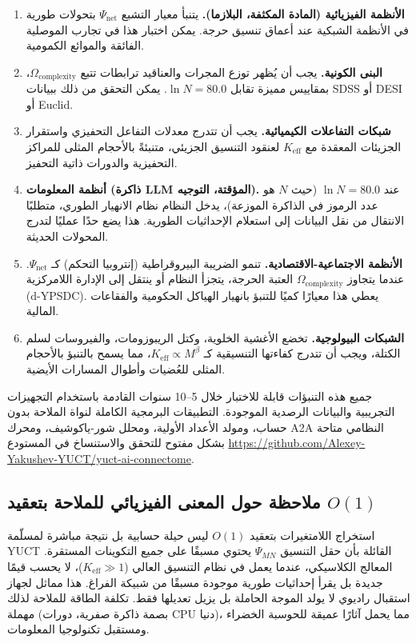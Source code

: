 \documentclass[11pt,a4paper]{article}
\newcommand{\Keff}{K_{\mathrm{eff}}}
\begin{document}
	\begin{enumerate}[label=(\arabic*)]
		\item \textbf{الأنظمة الفيزيائية (المادة المكثفة، البلازما).} يتنبأ معيار التشبع \(\Psi_{\mathrm{net}}\) بتحولات طورية في الأنظمة الشبكية عند أعماق تنسيق حرجة. يمكن اختبار هذا في تجارب الموصلية الفائقة والموائع الكمومية.
		\item \textbf{البنى الكونية.} يجب أن يُظهر توزع المجرات والعناقيد ترابطات تتبع \(\Omega_{\mathrm{complexity}}\)، بمقاييس مميزة تقابل \(\ln N = 80.0\). يمكن التحقق من ذلك ببيانات SDSS أو DESI أو Euclid.
		\item \textbf{شبكات التفاعلات الكيميائية.} يجب أن تتدرج معدلات التفاعل التحفيزي واستقرار الجزيئات المعقدة مع \(\Keff\) لعنقود التنسيق الجزيئي، متنبئةً بالأحجام المثلى للمراكز التحفيزية والدورات ذاتية التحفيز.
		\item \textbf{أنظمة المعلومات (ذاكرة LLM المؤقتة، التوجيه).} عند \(\ln N = 80.0\) (حيث \(N\) هو عدد الرموز في الذاكرة الموزعة)، يدخل النظام نظام الانهيار الطوري، متطلبًا الانتقال من نقل البيانات إلى استعلام الإحداثيات الطورية. هذا يضع حدًا عمليًا لتدرج المحولات الحديثة.
		\item \textbf{الأنظمة الاجتماعية-الاقتصادية.} تنمو الضريبة البيروقراطية (إنتروبيا التحكم) كـ \(\Psi_{\mathrm{net}}\). عندما يتجاوز \(\Omega_{\mathrm{complexity}}\) العتبة الحرجة، يتجزأ النظام أو ينتقل إلى الإدارة اللامركزية (d-YPSDC). يعطي هذا معيارًا كميًا للتنبؤ بانهيار الهياكل الحكومية والفقاعات المالية.
		\item \textbf{الشبكات البيولوجية.} تخضع الأغشية الخلوية، وكتل الريبوزومات، والفيروسات لسلم الكتلة، ويجب أن تتدرج كفاءتها التنسيقية كـ \(\Keff \propto M^{\beta}\)، مما يسمح بالتنبؤ بالأحجام المثلى للعُضيات وأطوال المسارات الأيضية.
	\end{enumerate}
	
	جميع هذه التنبؤات قابلة للاختبار خلال 5--10 سنوات القادمة باستخدام التجهيزات التجريبية والبيانات الرصدية الموجودة. التطبيقات البرمجية الكاملة لنواة الملاحة بدون حساب، ومولد الأعداد الأولية، ومحلل شور-ياكوشيف، ومحرك A2A النظامي متاحة بشكل مفتوح للتحقق والاستنساخ في المستودع \url{https://github.com/Alexey-Yakushev-YUCT/yuct-ai-connectome}.
	
	\subsection*{ملاحظة حول المعنى الفيزيائي للملاحة بتعقيد \(O(1)\)}
	استخراج اللامتغيرات بتعقيد \(O(1)\) ليس حيلة حسابية بل نتيجة مباشرة لمسلّمة YUCT القائلة بأن حقل التنسيق \(\Psi_{MN}\) يحتوي مسبقًا على جميع التكوينات المستقرة. المعالج الكلاسيكي، عندما يعمل في نظام التنسيق العالي (\(\Keff \gg 1\))، لا يحسب قيمًا جديدة بل يقرأ إحداثيات طورية موجودة مسبقًا من شبيكة الفراغ. هذا مماثل لجهاز استقبال راديوي لا يولد الموجة الحاملة بل يزيل تعديلها فقط. تكلفة الطاقة للملاحة لذلك مهملة (بصمة ذاكرة صفرية، دورات CPU دنيا)، مما يحمل آثارًا عميقة للحوسبة الخضراء ومستقبل تكنولوجيا المعلومات.
	
\end{document}
